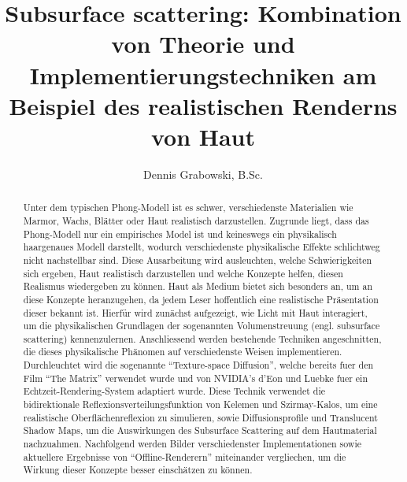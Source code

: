 \documentclass[ngerman,runningheads,a4paper]{llncs}[2018/03/10]
\begin{document}
\title{Subsurface scattering: Kombination von Theorie und Implementierungstechniken am Beispiel des realistischen Renderns von Haut}
{}

\author{Dennis Grabowski, B.Sc.}
{}


\maketitle

\begin{abstract}
  Unter dem typischen Phong-Modell ist es schwer, verschiedenste Materialien wie Marmor, Wachs, Blätter oder Haut realistisch dar\-zu\-stellen.
  Zugrunde liegt, dass das Phong-Modell nur ein empirisches Model ist und keineswegs ein physikalisch haargenaues Modell darstellt, wodurch verschiedenste physikalische Effekte schlichtweg nicht nachstellbar sind.
  Diese Ausarbeitung wird ausleuchten, welche Schwierigkeiten sich ergeben, Haut realistisch darzustellen und welche Konzepte helfen, diesen Realismus wiedergeben zu können.
  Haut als Medium bietet sich besonders an, um an diese Konzepte heranzugehen, da jedem Leser hoffentlich eine realistische Präsentation dieser bekannt ist.
  Hierfür wird zunächst aufgezeigt, wie Licht mit Haut interagiert, um die physikalischen Grundlagen der sogenannten Volumenstreuung (engl. subsurface scattering) kennenzulernen.
  Anschliessend werden bestehende Techniken angeschnitten, die dieses physikalische Phänomen auf verschiedenste Weisen implementieren.
  Durchleuchtet wird die sogenannte \enquote{Texture-space Diffusion}, welche bereits fuer den Film \enquote{The Matrix} verwendet wurde und von NVIDIA's d'Eon und Luebke fuer ein Echtzeit-Rendering-System adaptiert wurde.
  Diese Technik verwendet die bidirektionale Reflexionsverteilungsfunktion von Kelemen und Szirmay-Kalos, um eine realistische Oberflächenreflexion zu simulieren, sowie Diffusionsprofile und Translucent Shadow Maps, um die Auswirkungen des Subsurface Scattering auf dem Hautmaterial nachzuahmen.
  Nachfolgend werden Bilder verschiedenster Implementationen sowie aktuellere Ergebnisse von \enquote{Offline-Renderern} miteinander vergliechen, um die Wirkung dieser Konzepte besser einschätzen zu können.
\end{abstract}
\end{document}
